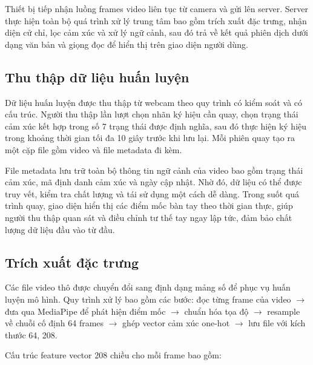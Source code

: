 Thiết bị tiếp nhận luồng frames video liên tục từ camera và gửi lên server.
Server thực hiện toàn bộ quá trình xử lý trung tâm bao gồm trích xuất đặc trưng,
nhận diện cử chỉ, lọc cảm xúc và xử lý ngữ cảnh, sau đó trả về kết quả phiên
dịch dưới dạng văn bản và giọng đọc để hiển thị trên giao diện người dùng.

\subsection{Thu thập dữ liệu huấn luyện}

Dữ liệu huấn luyện được thu thập từ webcam theo quy trình có kiểm soát và có
cấu trúc. Người thu thập lần lượt chọn nhãn ký hiệu cần quay, chọn trạng thái
cảm xúc kết hợp trong số 7 trạng thái được định nghĩa, sau đó thực hiện ký hiệu
trong khoảng thời gian tối đa 10 giây trước khi lưu lại. Mỗi phiên quay tạo ra
một cặp file gồm video và file metadata đi kèm.

File metadata lưu trữ toàn bộ thông tin ngữ cảnh của video bao gồm trạng thái
cảm xúc, mã định danh cảm xúc và ngày cập nhật. Nhờ đó, dữ liệu có thể được
truy vết, kiểm tra chất lượng và tái sử dụng một cách dễ dàng. Trong suốt quá
trình quay, giao diện hiển thị các điểm mốc bàn tay theo thời gian thực, giúp
người thu thập quan sát và điều chỉnh tư thế tay ngay lập tức, đảm bảo chất
lượng dữ liệu đầu vào từ đầu.

\subsection{Trích xuất đặc trưng}

Các file video thô được chuyển đổi sang định dạng mảng số để phục vụ huấn luyện
mô hình. Quy trình xử lý bao gồm các bước: đọc từng frame của video $\rightarrow$
đưa qua MediaPipe để phát hiện điểm mốc $\rightarrow$ chuẩn hóa tọa độ
$\rightarrow$ resample về chuỗi cố định 64 frames $\rightarrow$ ghép vector cảm
xúc one-hot $\rightarrow$ lưu file với kích thước 64, 208.

Cấu trúc feature vector 208 chiều cho mỗi frame bao gồm:

